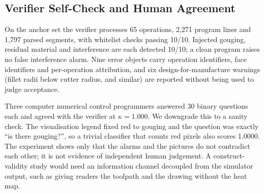 \subsection{Verifier Self-Check and Human Agreement}

On the anchor set the verifier processes 65 operations, 2,271 program lines and 1,797 parsed segments, with whitelist checks passing 10/10. Injected gouging, residual material and interference are each detected 10/10; a clean program raises no false interference alarm. Nine error objects carry operation identifiers, face identifiers and per-operation attribution, and six design-for-manufacture warnings (fillet radii below cutter radius, and similar) are reported without being used to judge acceptance.

Three computer numerical control programmers answered 30 binary questions each and agreed with the verifier at $\kappa=1.000$. We downgrade this to a sanity check. The visualisation legend fixed red to gouging and the question was exactly ``is there gouging?'', so a trivial classifier that counts red pixels also scores 1.0000. The experiment shows only that the alarms and the pictures do not contradict each other; it is not evidence of independent human judgement. A construct-validity study would need an information channel decoupled from the simulator output, such as giving readers the toolpath and the drawing without the heat map.
